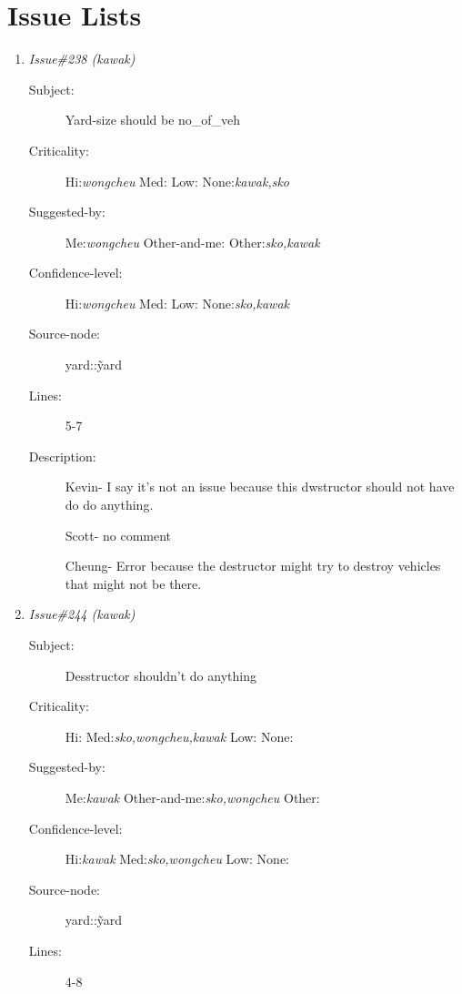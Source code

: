 \section{Issue Lists}
\begin{enumerate}
\item {\it Issue\#238 (kawak)}
\begin{description}
\item [Subject:] Yard-size should be no\_of\_veh
\item [Criticality:] Hi:{\it wongcheu} Med:{\it } Low:{\it } None:{\it kawak,sko}
\item [Suggested-by:] Me:{\it wongcheu} Other-and-me:{\it } Other:{\it sko,kawak}
\item [Confidence-level:] Hi:{\it wongcheu} Med:{\it } Low:{\it } None:{\it sko,kawak}
\item [Source-node:] yard::\~yard

\item [Lines:] 5-7

\item [Description:] Kevin- I say it's not an issue because this dwstructor should not have do do
anything.

Scott- no comment

Cheung- Error because the destructor might try to destroy vehicles that might
not be there.
\end{description}
\item {\it Issue\#244 (kawak)}
\begin{description}
\item [Subject:] Desstructor shouldn't do anything
\item [Criticality:] Hi:{\it } Med:{\it sko,wongcheu,kawak} Low:{\it } None:{\it }
\item [Suggested-by:] Me:{\it kawak} Other-and-me:{\it sko,wongcheu} Other:{\it }
\item [Confidence-level:] Hi:{\it kawak} Med:{\it sko,wongcheu} Low:{\it } None:{\it }
\item [Source-node:] yard::\~yard

\item [Lines:] 4-8


\end{description}
\end{enumerate}
